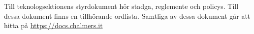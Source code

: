 Till teknologsektionens styrdokument hör stadga, reglemente och policys.
Till dessa dokument finns en tillhörande ordlista.
Samtliga av dessa dokument går att hitta på \url{https://docs.chalmers.it} 

